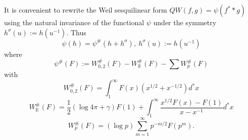 \documentclass[cupthm]{CUP-JNL-JMJ}
\def\R{{\mathbb R}}
\numberwithin{equation}{section}
\theoremstyle{cupplain}
\theoremstyle{cupdefinition}
\theoremstyle{cupremark}
\theoremstyle{cupproof}
\begin{document}
It is convenient to rewrite the Weil sesquilinear form $QW(f,g)=\psi(f^**g)$  using the natural invariance of the functional $\psi$ under the symmetry $ h^\sigma(u):=h(u^{-1})$. Thus 
\begin{equation}\label{weilQexp}
 \psi(h)=\psi^\#(h+h^\sigma),\ h^\sigma(u):=h(u^{-1})
\end{equation}
where 
\begin{equation}\label{bombtestsum}
\psi^\#(F):=W_{0,2}^\#(F)- W_\R^\#(F)-\sum W_p^\#(F)
 \end{equation}
with
\begin{equation}\label{bombtest2}
W_{0,2}^\#(F)=\int_{1}^{\infty} F(x)(x^{1/2}+x^{-1/2})d^*x
 \end{equation}
\begin{equation}\label{bombtest1}
W_\R^\#(F)=\frac 12(\log 4\pi +\gamma)F(1)+\int_{1}^\infty\frac{x^{1/2}F(x)-F(1)}{x-x^{-1}}d^*x
 \end{equation}
 \begin{equation}\label{bombtest3}
  W_p^\#(F)=(\log p)\sum_{m=1}^\infty p^{-m/2}F(p^m).
 \end{equation}
 
\end{document}
